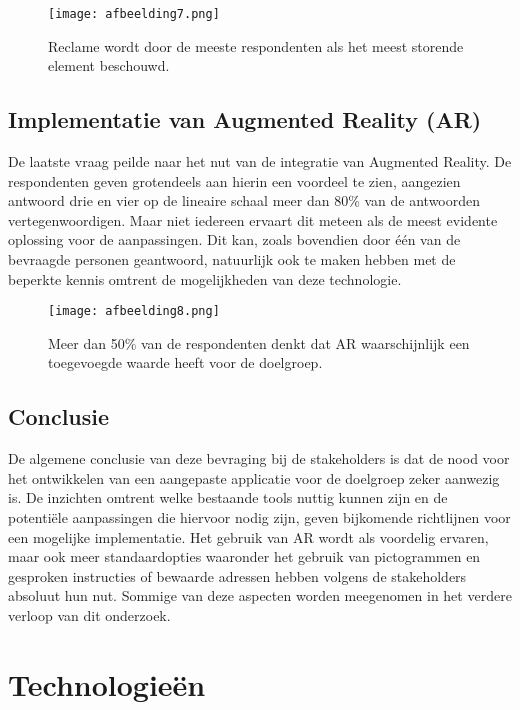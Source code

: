 \begin{figure}[h]
    \centering
    \texttt{[image: afbeelding7.png]}
    \caption{Reclame wordt door de meeste respondenten als het meest storende element beschouwd.}
    \label{fig:selectiestorend}
\end{figure}

\subsection*{Implementatie van Augmented Reality (AR)}
De laatste vraag peilde naar het nut van de integratie van Augmented Reality. De respondenten geven grotendeels aan hierin een voordeel te zien, aangezien antwoord drie en vier op de lineaire schaal meer dan 80\% van de antwoorden vertegenwoordigen. Maar niet iedereen ervaart dit meteen als de meest evidente oplossing voor de aanpassingen. Dit kan, zoals bovendien door één van de bevraagde personen geantwoord, natuurlijk ook te maken hebben met de beperkte kennis omtrent de mogelijkheden van deze technologie.

\begin{figure}[h]
    \centering
    \texttt{[image: afbeelding8.png]}
    \caption{Meer dan 50\% van de respondenten denkt dat AR waarschijnlijk een toegevoegde waarde heeft voor de doelgroep.}
    \label{fig:meningar}
\end{figure}

\subsection*{Conclusie}
De algemene conclusie van deze bevraging bij de stakeholders is dat de nood voor het ontwikkelen van een aangepaste applicatie voor de doelgroep zeker aanwezig is. De inzichten omtrent welke bestaande tools nuttig kunnen zijn en de potentiële aanpassingen die hiervoor nodig zijn, geven bijkomende richtlijnen voor een mogelijke implementatie. Het gebruik van AR wordt als voordelig ervaren, maar ook meer standaardopties waaronder het gebruik van pictogrammen en gesproken instructies of bewaarde adressen hebben volgens de stakeholders absoluut hun nut. Sommige van deze aspecten worden meegenomen in het verdere verloop van dit onderzoek.

\section{Technologieën}
\label{sec:technologieën}

